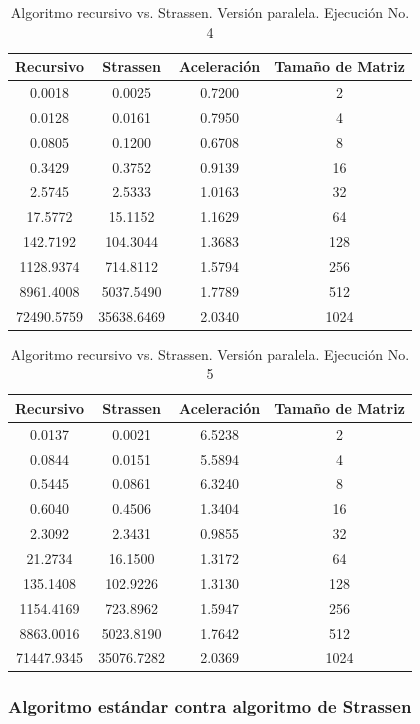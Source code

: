 \documentclass{article}
\begin{document}
\begin{table}[ht]
\centering
\begin{tabular}{|c|c|c|c|}
\hline
\textbf{Recursivo} & \textbf{Strassen} & \textbf{Aceleración} & \textbf{Tamaño de Matriz} \\
\hline
0.0018 & 0.0025 & 0.7200 & 2 \\
0.0128 & 0.0161 & 0.7950 & 4 \\
0.0805 & 0.1200 & 0.6708 & 8 \\
0.3429 & 0.3752 & 0.9139 & 16 \\
2.5745 & 2.5333 & 1.0163 & 32 \\
17.5772 & 15.1152 & 1.1629 & 64 \\
142.7192 & 104.3044 & 1.3683 & 128 \\
1128.9374 & 714.8112 & 1.5794 & 256 \\
8961.4008 & 5037.5490 & 1.7789 & 512 \\
72490.5759 & 35638.6469 & 2.0340 & 1024 \\
\hline
\end{tabular}
\caption{Algoritmo recursivo vs. Strassen. Versión paralela. Ejecución No. 4}
\end{table}

\begin{table}[ht]
\centering
\begin{tabular}{|c|c|c|c|}
\hline
\textbf{Recursivo} & \textbf{Strassen} & \textbf{Aceleración} & \textbf{Tamaño de Matriz} \\
\hline
0.0137 & 0.0021 & 6.5238 & 2 \\
0.0844 & 0.0151 & 5.5894 & 4 \\
0.5445 & 0.0861 & 6.3240 & 8 \\
0.6040 & 0.4506 & 1.3404 & 16 \\
2.3092 & 2.3431 & 0.9855 & 32 \\
21.2734 & 16.1500 & 1.3172 & 64 \\
135.1408 & 102.9226 & 1.3130 & 128 \\
1154.4169 & 723.8962 & 1.5947 & 256 \\
8863.0016 & 5023.8190 & 1.7642 & 512 \\
71447.9345 & 35076.7282 & 2.0369 & 1024 \\
\hline
\end{tabular}
\caption{Algoritmo recursivo vs. Strassen. Versión paralela. Ejecución No. 5}
\end{table}

\clearpage

\subsubsection{Algoritmo estándar contra algoritmo de Strassen}
\end{document}
